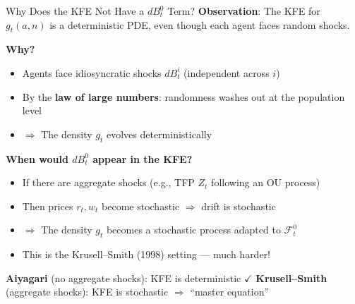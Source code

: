 \documentclass[aspectratio=169,11pt]{beamer}
\newcommand{\emphc}[1]{\textcolor{harvardcrimson}{#1}}
\begin{document}
\begin{frame}{Why Does the KFE Not Have a $dB_t^0$ Term?}
\small
\textbf{Observation}: The KFE for $g_t(a,n)$ is a \emphc{deterministic} PDE, even though each agent faces random shocks.

\vspace{0.1em}
\textbf{Why?}
\begin{itemize}\itemsep0pt
    \item Agents face \emphc{idiosyncratic} shocks $dB_t^i$ (independent across $i$)
    \item By the \textbf{law of large numbers}: randomness washes out at the population level
    \item $\Rightarrow$ The density $g_t$ evolves \emphc{deterministically}
\end{itemize}

\vspace{0.1em}
\textbf{When would $dB_t^0$ appear in the KFE?}
\begin{itemize}\itemsep0pt
    \item If there are \emphc{aggregate shocks} (e.g., TFP $Z_t$ following an OU process)
    \item Then prices $r_t, w_t$ become stochastic $\Rightarrow$ drift is stochastic
    \item $\Rightarrow$ The density $g_t$ becomes a \emphc{stochastic process} adapted to $\mathcal{F}_t^0$
    \item This is the \emphc{Krusell--Smith} (1998) setting --- much harder!
\end{itemize}

\vspace{0.1em}
{\centering\scriptsize
\textbf{Aiyagari} (no aggregate shocks): KFE is deterministic $\checkmark$ \quad
\textbf{Krusell--Smith} (aggregate shocks): KFE is stochastic $\Rightarrow$ ``master equation''\\}
\end{frame}
\end{document}
